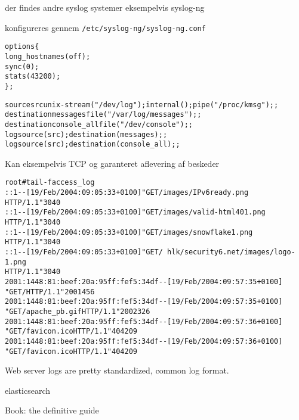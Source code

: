 \documentclass[Screen16to9,17pt]{foils}
\begin{document}

\begin{list2}
\item der findes andre syslog systemer eksempelvis syslog-ng
\item konfigureres gennem \verb+/etc/syslog-ng/syslog-ng.conf+
\end{list2}

\begin{alltt}
\small
options \{
        long_hostnames(off);
        sync(0);
        stats(43200);
\};

source src { unix-stream("/dev/log"); internal(); pipe("/proc/kmsg"); };
destination messages { file("/var/log/messages"); };
destination console_all { file("/dev/console"); };
log { source(src); destination(messages); };
log { source(src); destination(console_all); };
\end{alltt}
Kan eksempelvis TCP og garanteret aflevering af beskeder


\begin{alltt}
\footnotesize
root# tail -f access_log
::1 - - [19/Feb/2004:09:05:33 +0100] "GET /images/IPv6ready.png
HTTP/1.1" 304 0
::1 - - [19/Feb/2004:09:05:33 +0100] "GET /images/valid-html401.png
HTTP/1.1" 304 0
::1 - - [19/Feb/2004:09:05:33 +0100] "GET /images/snowflake1.png
HTTP/1.1" 304 0
::1 - - [19/Feb/2004:09:05:33 +0100] "GET /~hlk/security6.net/images/logo-1.png
HTTP/1.1" 304 0
2001:1448:81:beef:20a:95ff:fef5:34df - - [19/Feb/2004:09:57:35 +0100]
"GET / HTTP/1.1" 200 1456
2001:1448:81:beef:20a:95ff:fef5:34df - - [19/Feb/2004:09:57:35 +0100]
"GET /apache_pb.gif HTTP/1.1" 200 2326
2001:1448:81:beef:20a:95ff:fef5:34df - - [19/Feb/2004:09:57:36 +0100]
"GET /favicon.ico HTTP/1.1" 404 209
2001:1448:81:beef:20a:95ff:fef5:34df - - [19/Feb/2004:09:57:36 +0100]
"GET /favicon.ico HTTP/1.1" 404 209
\end{alltt}
\vskip 1cm

Web server logs are pretty standardized, common log format.





{\color{green}\Large elasticsearch}

Book: the definitive guide

{\small
{}


}
\end{document}
